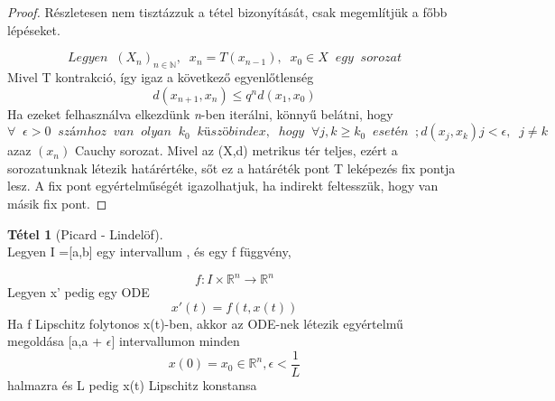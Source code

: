 \documentclass{article}
\theoremstyle{definition}
\theoremstyle{theorem}
\newtheorem{theorem}{Tétel}
\begin{document}
\begin{proof}
Részletesen nem tisztázzuk a tétel bizonyítását, csak megemlítjük a főbb lépéseket.

\begin{equation*}
Legyen\;\;(X_n)_{n \in \mathbb{N}},\;\; x_n = T(x_{n-1}), \;\;x_0 \in X \;\;egy \;\; sorozat
\end{equation*}
Mivel T kontrakció, így igaz a következő egyenlőtlenség
\begin{equation*}
    d(x_{n+1},x_n) \leq q^n d(x_1,x_0)
\end{equation*}
Ha ezeket felhasználva elkezdünk \textit{n}-ben iterálni, könnyű belátni, hogy
\begin{equation*}
    \forall \;\; \epsilon >0 \;\; számhoz \;\; van \;\; olyan \;\; k_0 \;\;küszöbindex,\;\;hogy\;\; \forall j,k \geq k_0 \;\;esetén \;\;;d(x_j,x_k) j < \epsilon, \;\;j\neq k  \;\;
\end{equation*}
azaz  $(x_n)$ Cauchy  sorozat.
Mivel az (X,d) metrikus tér teljes, ezért a sorozatunknak létezik határértéke, sőt ez a határéték pont T leképezés fix pontja lesz. A fix pont egyértelműségét igazolhatjuk, ha indirekt feltesszük, hogy van másik fix pont.
\end{proof}
\begin{theorem} [Picard - Lindelöf] \\
Legyen I =[a,b] egy intervallum , és egy f függvény,

\begin{equation*}
f :  I \times \mathbb{R}^n \rightarrow \mathbb{R}^n
\end{equation*}
Legyen x' pedig egy ODE
\[
x'(t) = f(t,x(t))
\]
Ha f Lipschitz folytonos x(t)-ben, akkor az ODE-nek létezik egyértelmű megoldása [a,a + $\epsilon$]
intervallumon minden
\[
x(0) = x_0 \in \mathbb{R}^n, \epsilon < \frac{1}{L}
\] halmazra és L pedig x(t) Lipschitz konstansa
\end{theorem}
\end{document}
